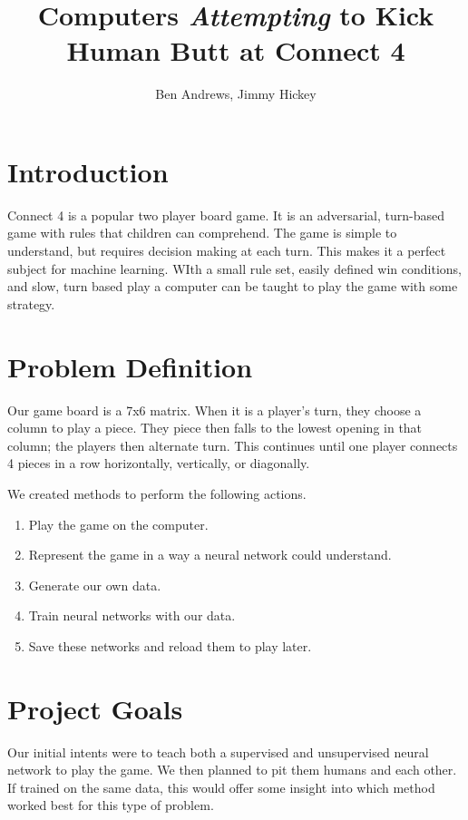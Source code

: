 \documentclass[12pt]{article}
\title{Computers \textit{Attempting} to Kick Human Butt at Connect 4}
\author{Ben Andrews, Jimmy Hickey}
\begin{document}
	\maketitle
	\tableofcontents
	\clearpage

\doublespacing
\section{Introduction}
Connect 4 is a popular two player board game. It is an adversarial, turn-based game with rules that children can comprehend. The game is simple to understand, but requires decision making at each turn. This makes it a perfect subject for machine learning. WIth a small rule set, easily defined win conditions, and slow, turn based play a computer can be taught to play the game with some strategy.

\section{Problem Definition}
Our game board is a 7x6 matrix. When it is a player's turn, they choose a column to play a piece. They piece then falls to the lowest opening in that column; the players then alternate turn. This continues until one player connects 4 pieces in a row horizontally, vertically, or diagonally. 

We created methods to perform the following actions.

\singlespacing
\begin{enumerate}
\item Play the game on the computer.
\item Represent the game in a way a neural network could understand.
\item Generate our own data.
\item Train neural networks with our data.
\item Save these networks and reload them to play later.
\end{enumerate}
\doublespacing

\section{Project Goals}
Our initial intents were to teach both a supervised and unsupervised neural network to play the game. We then planned to pit them humans and each other. If trained on the same data, this would offer some insight into which method worked best for this type of problem.
\end{document}
